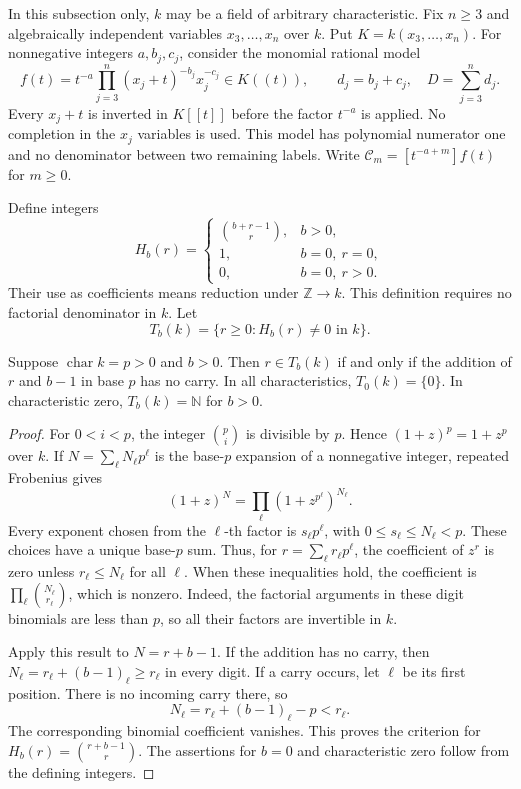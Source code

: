 In this subsection only, \(k\) may be a field of arbitrary
characteristic.  Fix \(n\ge3\) and algebraically independent
variables \(x_3,\ldots,x_n\) over \(k\).  Put
\(K=k(x_3,\ldots,x_n)\).  For nonnegative integers
\(a,b_j,c_j\), consider the monomial rational model
\begin{equation}\label{op:eq:monomial-collision-model}
 f(t)=t^{-a}\prod_{j=3}^n(x_j+t)^{-b_j}x_j^{-c_j}
 \in K((t)),\qquad d_j=b_j+c_j,\quad D=\sum_{j=3}^nd_j.
\end{equation}
Every \(x_j+t\) is inverted in \(K[[t]]\) before the factor
\(t^{-a}\) is applied.  No completion in the \(x_j\) variables
is used.  This model has polynomial numerator one and no
denominator between two remaining labels.  Write
\(\mathcal C_m=[t^{-a+m}]f(t)\) for \(m\ge0\).

Define integers
\[
 H_b(r)=
 \begin{cases}
 \binom{b+r-1}{r},&b>0,\\
 1,&b=0,\ r=0,\\
 0,&b=0,\ r>0.
 \end{cases}
\]
Their use as coefficients means reduction under \(\mathbb Z\to k\).
This definition requires no factorial denominator in \(k\).
Let
\[
 T_b(k)=\{r\ge0:H_b(r)\ne0\text{ in }k\}.
\]

\begin{lemma}
\label{op:lem:pole-no-carry}
Suppose \(\operatorname{char}k=p>0\) and \(b>0\).
Then \(r\in T_b(k)\) if and only if the addition of \(r\)
and \(b-1\) in base \(p\) has no carry.  In all
characteristics, \(T_0(k)=\{0\}\).  In characteristic zero,
\(T_b(k)=\mathbb N\) for \(b>0\).
\end{lemma}

\begin{proof}
For \(0<i<p\), the integer \(\binom pi\) is divisible by
\(p\).  Hence \((1+z)^p=1+z^p\) over \(k\).
If \(N=\sum_\ell N_\ell p^\ell\) is the base-\(p\)
expansion of a nonnegative integer, repeated Frobenius gives
\[
 (1+z)^N=\prod_\ell(1+z^{p^\ell})^{N_\ell}.
\]
Every exponent chosen from the \(\ell\)-th factor is
\(s_\ell p^\ell\), with \(0\le s_\ell\le N_\ell<p\).
These choices have a unique base-\(p\) sum.  Thus, for
\(r=\sum_\ell r_\ell p^\ell\), the coefficient of \(z^r\)
is zero unless \(r_\ell\le N_\ell\) for all \(\ell\).
When these inequalities hold, the coefficient is
\(\prod_\ell\binom{N_\ell}{r_\ell}\), which is nonzero.
Indeed, the factorial arguments in these digit binomials are less
than \(p\), so all their factors are invertible in \(k\).

Apply this result to \(N=r+b-1\).  If the addition has no
carry, then \(N_\ell=r_\ell+(b-1)_\ell\ge r_\ell\)
in every digit.  If a carry occurs, let \(\ell\) be its first
position.  There is no incoming carry there, so
\[
 N_\ell=r_\ell+(b-1)_\ell-p<r_\ell.
\]
The corresponding binomial coefficient vanishes.  This proves the
criterion for \(H_b(r)=\binom{r+b-1}{r}\).
The assertions for \(b=0\) and characteristic zero follow from
the defining integers.
\end{proof}

